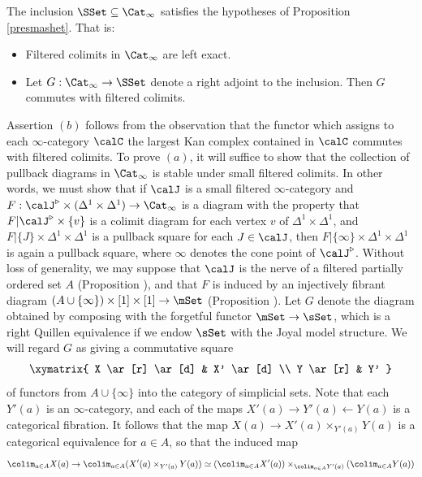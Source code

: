 \begin{remark}\label{postsmashet}
The inclusion $\SSet \subseteq \Cat_{\infty}$ satisfies the hypotheses of Proposition \ref{presmashet}. That is:
\begin{itemize}
\item[$(a)$] Filtered colimits in $\Cat_{\infty}$ are left exact.
\item[$(b)$] Let $G: \Cat_{\infty} \rightarrow \SSet$ denote a right adjoint to the inclusion. Then
$G$ commutes with filtered colimits.
\end{itemize}
Assertion $(b)$ follows from the observation that the functor which assigns to each $\infty$-category $\calC$ the largest Kan complex contained in $\calC$ commutes with filtered colimits.
To prove $(a)$, it will suffice to show that the collection of pullback diagrams
in $\Cat_{\infty}$ is stable under small filtered colimits. In other words, we must show that
if $\calJ$ is a small filtered $\infty$-category and $F: \calJ^{\triangleright} \times (\Delta^1 \times \Delta^1) \rightarrow \Cat_{\infty}$ is a diagram with the property that 
$F | \calJ^{\triangleright} \times \{v\}$ is a colimit diagram for each vertex $v$ of $\Delta^1 \times \Delta^1$, and $F | \{J\} \times \Delta^1 \times \Delta^1$ is a pullback square for each $J \in \calJ$, then
$F | \{\infty\} \times \Delta^1 \times \Delta^1$ is again a pullback square, where $\infty$ denotes the cone point of $\calJ^{\triangleright}$. Without loss of generality, we may suppose that $\calJ$ is the
nerve of a filtered partially ordered set $A$ (Proposition ), and that
$F$ is induced by an injectively fibrant diagram $(A \cup \{\infty\}) \times [1] \times [1] \rightarrow \mSet$
(Proposition ). Let $G$ denote the diagram obtained by composing with
the forgetful functor $\mSet \rightarrow \sSet$, which is a right Quillen equivalence if we endow
$\sSet$ with the Joyal model structure. We will regard $G$ as giving a commutative square
$$ \xymatrix{ X \ar[r] \ar[d] & X' \ar[d] \\
Y \ar[r] & Y' }$$
of functors from $A \cup \{ \infty \}$ into the category of simplicial sets. Note that each
$Y'(a)$ is an $\infty$-category, and each of the maps $X'(a) \rightarrow Y'(a) \leftarrow Y(a)$ is
a categorical fibration. It follows that the map $X(a) \rightarrow X'(a) \times_{ Y'(a)} Y(a)$ is
a categorical equivalence for $a \in A$, so that the induced map
$$ \colim_{a \in A} X(a) \rightarrow \colim_{a \in A} (X'(a) \times_{ Y'(a)} Y(a) )
\simeq (\colim_{a \in A} X'(a)) \times_{ \colim_{a \in A} Y'(a) } ( \colim_{a \in A} Y(a) )$$

\end{remark}
